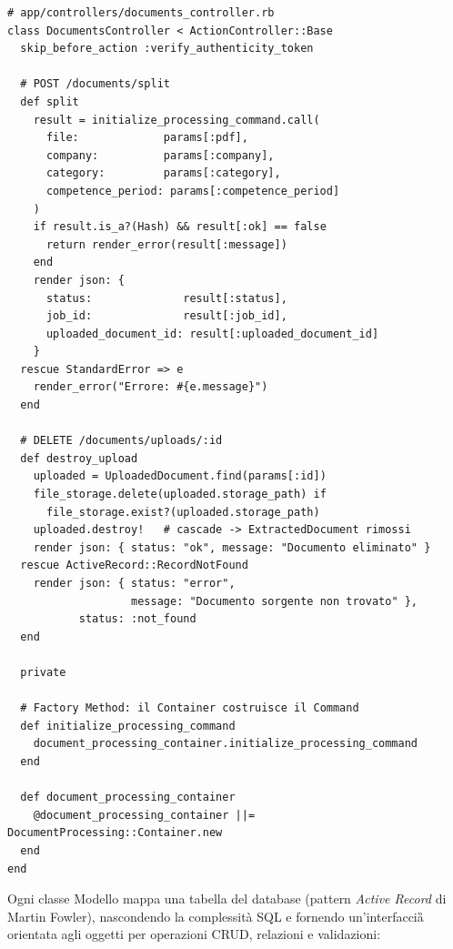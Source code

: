 \documentclass[a4paper,11pt]{article}
\newcommand{\pattern}[1]{\textit{#1}}
\begin{document}
\begin{lstlisting}[caption={DocumentsController -- Controller MVC che delega ai Command}]
# app/controllers/documents_controller.rb
class DocumentsController < ActionController::Base
  skip_before_action :verify_authenticity_token

  # POST /documents/split
  def split
    result = initialize_processing_command.call(
      file:             params[:pdf],
      company:          params[:company],
      category:         params[:category],
      competence_period: params[:competence_period]
    )
    if result.is_a?(Hash) && result[:ok] == false
      return render_error(result[:message])
    end
    render json: {
      status:              result[:status],
      job_id:              result[:job_id],
      uploaded_document_id: result[:uploaded_document_id]
    }
  rescue StandardError => e
    render_error("Errore: #{e.message}")
  end

  # DELETE /documents/uploads/:id
  def destroy_upload
    uploaded = UploadedDocument.find(params[:id])
    file_storage.delete(uploaded.storage_path) if
      file_storage.exist?(uploaded.storage_path)
    uploaded.destroy!   # cascade -> ExtractedDocument rimossi
    render json: { status: "ok", message: "Documento eliminato" }
  rescue ActiveRecord::RecordNotFound
    render json: { status: "error",
                   message: "Documento sorgente non trovato" },
           status: :not_found
  end

  private

  # Factory Method: il Container costruisce il Command
  def initialize_processing_command
    document_processing_container.initialize_processing_command
  end

  def document_processing_container
    @document_processing_container ||= DocumentProcessing::Container.new
  end
end
\end{lstlisting}


Ogni classe Modello mappa una tabella del database (pattern \pattern{Active
Record} di Martin Fowler), nascondendo la complessità SQL e fornendo
un'interfaccia\G{} orientata agli oggetti per operazioni CRUD, relazioni e
validazioni:
\end{document}
